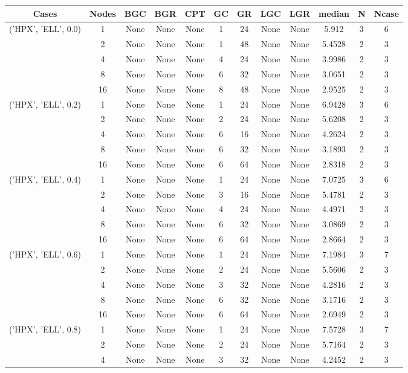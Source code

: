 \begin{tabular}{cccccccccccc}
\hline
Cases & Nodes& BGC& BGR& CPT& GC& GR& LGC& LGR& median & N & Ncase \\
\hline
\multirow{5}{*}{('HPX', 'ELL', 0.0)}& 1& None& None& None& 1& 24& None& None& 5.912& 3& 6\\
& 2& None& None& None& 1& 48& None& None& 5.4528& 2& 3\\
& 4& None& None& None& 4& 24& None& None& 3.9986& 2& 3\\
& 8& None& None& None& 6& 32& None& None& 3.0651& 2& 3\\
& 16& None& None& None& 8& 48& None& None& 2.9525& 2& 3\\
\hline
\multirow{5}{*}{('HPX', 'ELL', 0.2)}& 1& None& None& None& 1& 24& None& None& 6.9428& 3& 6\\
& 2& None& None& None& 2& 24& None& None& 5.6208& 2& 3\\
& 4& None& None& None& 6& 16& None& None& 4.2624& 2& 3\\
& 8& None& None& None& 6& 32& None& None& 3.1893& 2& 3\\
& 16& None& None& None& 6& 64& None& None& 2.8318& 2& 3\\
\hline
\multirow{5}{*}{('HPX', 'ELL', 0.4)}& 1& None& None& None& 1& 24& None& None& 7.0725& 3& 6\\
& 2& None& None& None& 3& 16& None& None& 5.4781& 2& 3\\
& 4& None& None& None& 4& 24& None& None& 4.4971& 2& 3\\
& 8& None& None& None& 6& 32& None& None& 3.0869& 2& 3\\
& 16& None& None& None& 6& 64& None& None& 2.8664& 2& 3\\
\hline
\multirow{5}{*}{('HPX', 'ELL', 0.6)}& 1& None& None& None& 1& 24& None& None& 7.1984& 3& 7\\
& 2& None& None& None& 2& 24& None& None& 5.5606& 2& 3\\
& 4& None& None& None& 3& 32& None& None& 4.2816& 2& 3\\
& 8& None& None& None& 6& 32& None& None& 3.1716& 2& 3\\
& 16& None& None& None& 6& 64& None& None& 2.6949& 2& 3\\
\hline
\multirow{5}{*}{('HPX', 'ELL', 0.8)}& 1& None& None& None& 1& 24& None& None& 7.5728& 3& 7\\
& 2& None& None& None& 2& 24& None& None& 5.7164& 2& 3\\
& 4& None& None& None& 3& 32& None& None& 4.2452& 2& 3\\

\end{tabular}
